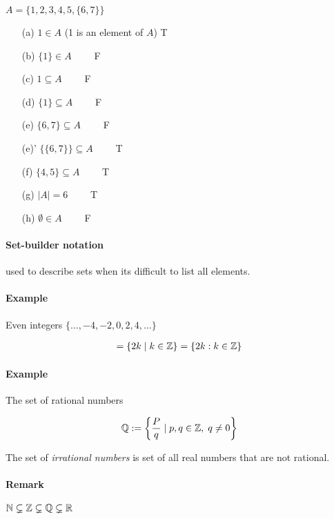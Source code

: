\documentclass[../main.tex]{subfiles}
\begin{document}
$ A = \{1, 2, 3, 4, 5, \{6, 7\}\}$

\begin{enumerate}
    \item [(a)] $1 \in A$ (1 is an element of $A$) T
    \item [(b)] $\{1\} \in A \qquad$ F
    \item [(c)] $1 \subseteq A \qquad$ F
    \item [(d)] $\{1\} \subseteq A \qquad$ F
    \item [(e)] $\{6, 7\} \subseteq A \qquad$ F
    \item [(e)'] $\{\{6,7\}\} \subseteq A \qquad$ T
    \item [(f)] $\{4, 5\} \subseteq A \qquad$ T
    \item [(g)] $|A| = 6 \qquad$ T
    \item [(h)] $\emptyset \in A \qquad$ F
\end{enumerate}

\paragraph{Set-builder notation} used to describe sets when its difficult to list all elements.

\paragraph{Example} Even integers $\{\dots, -4, -2, 0, 2, 4, \dots\}$

\begin{align*}
    = \{2k \; | \;  k \in \mathbb{Z}\} = \{2k : k \in \mathbb{Z}\}
\end{align*}

\paragraph{Example} The set of rational numbers

\begin{align*}
    \Q :=\qt{\frac{P}{q} \; | \; p, q \in \Z, \; q \neq 0}
\end{align*}

The set of \emph{irrational numbers} is set of all real numbers that are not rational.

\paragraph{Remark} $\mathbb{N} \subsetneq \mathbb{Z} \subsetneq \mathbb{Q} \subsetneq \mathbb{R}$
\end{document}
